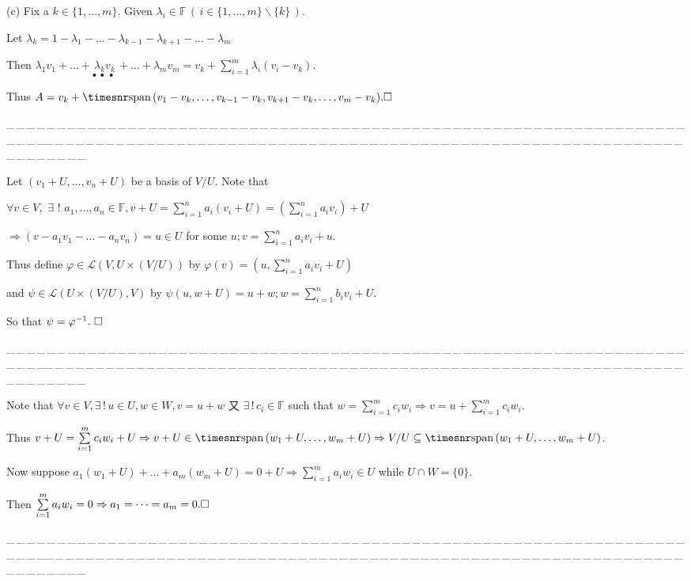 \documentclass[a4paper, 11pt, UTF8]{article}
\def\Spn{{\timesnr\textup{span}}\,}
\def\Lm{\mathcal{L}}
\def\Fbb{{\mathbb{F}}}
\def\Hc{\quad\hspace{7.6pt}}
\def\ProblemEnding{{\tiny \_\,\_\,\_\,\_\,\_\,\_\,\_\,\_\,\_\,\_\,\_\,\_\,\_\,\_\,\_\,\_\,\_\,\_\,\_\,\_\,\_\,\_\,\_\,\_\,\_\,\_\,\_\,\_\,\_\,\_\,\_\,\_\,\_\,\_\,\_\,\_\,\_\,\_\,\_\,\_\,\_\,\_\,\_\,\_\,\_\,\_\,\_\,\_\,\_\,\_\,\_\,\_\,\_\,\_\,\_\,\_\,\_\,\_\,\_\,\_\,\_\,\_\,\_\,\_\,\_\,\_\,\_\,\_\,\_\,\_\,\_\_\,\_\,\_\,\_\,\_\,\_\,\_\,\_\,\_\,\_\,\_\,\_\,\_\,\_\,\_\,\_\,\_\,\_\,\_\,\_\,\_\,\_\,\_\,\_\,\_\,\_\,\_\,\_\,\_\,\_\,\_\,\_\,\_\,\_\,\_\,\_\,\_\,\_\,\_\,\_\,\_\,\_\,\_\,\_\,\_\,\_\,\_\,\_\,\_\,\_\,\_\,\_\,\_\,\_\,\_\,\_\,\_\,\_\,\_\,\_\,\_\,\_\,\_\,\_\,\_\,\_\,\_\,\_\,\_\,\_\,\_}}
\begin{document}
\begin{large}
\par\vspace{6pt}\quad
(c) Fix a $k\in\{1,\dots,m\}.$ Given $\lambda_i\in\Fbb\,(\,i\in\{1,\dots,m\}\backslash\{k\}\,).$\par\quad\Hc
Let $\lambda_k=1-\lambda_1-\dots-\lambda_{k-1}-\lambda_{k+1}-\dots-\lambda_m$\par\quad\Hc
Then $\lambda_1 v_1+\dots+\underset{\bullet\,\,\bullet\,\,\bullet\,\,}{\lambda_k v_k}+\dots+\lambda_m v_m=v_k+\sum\limits_{i=1}^m\lambda_i(v_i-v_k)$.\par\quad\Hc
Thus $A=v_k+\Spn(v_1-v_k,\dots,v_{k-1}-v_k,v_{k+1}-v_k,\dots,v_m-v_k).\hfill\square$\par
\ProblemEnding\par

\par\quad
Let $(v_1+U,\dots,v_n+U)$ be a basis of $V/U$. Note that\par\quad
$\forall v\in V,\,\,\exists\,\,!\,\,a_1,\dots,a_n\in\Fbb,v+U=\sum\limits_{i=1}^n a_i(v_i+U)=(\sum\limits_{i=1}^n a_i v_i)+U$\par\quad
$\Rightarrow(v-a_1 v_1-\dots-a_n v_n)=u\in U$ for some $u;v=\sum\limits_{i=1}^n a_i v_i+u$.\par\quad
Thus define $\varphi\in\Lm\left(V,U\times(V/U)\right)$ by $\varphi(v)=(u,\sum\limits_{i=1}^n a_i v_i+U)$\par\qquad\qquad
and $\psi\in\Lm(U\times(V/U),V)$ by $\psi(u,w+U)=u+w;w=\sum\limits_{i=1}^n b_i v_i+U$.\par\quad
So that $\psi=\varphi^{-1}.\,\,\hfill\square$\par
\ProblemEnding\par

\par\quad
Note that $\forall v\in V,\exists\,!\,u\in U,w\in W,v=u+w$ 又 $\exists\,!\,c_i\in\Fbb$ such that $w=\sum\limits_{i=1}^m c_i w_i\Rightarrow v=u+\sum\limits_{i=1}^m c_i w_i$.\par\quad
Thus $v+U=\sum\limits_{i=1}^m c_i w_i+U\Rightarrow v+U\in\Spn(w_1+U,\dots,w_m+U)\Rightarrow V/U\subseteq\Spn(w_1+U,\dots,w_m+U)$.\par\quad
Now suppose $a_1(w_1+U)+\dots+a_m(w_m+U)=0+U\Rightarrow\sum\limits_{i=1}^m a_i w_i\in U$ while $U\cap W=\{0\}$.\par\quad
Then $\sum\limits_{i=1}^m a_i w_i=0\Rightarrow a_1=\dots=a_m=0.\hfill\square$\par
\ProblemEnding\par


\end{large}
\end{document}
